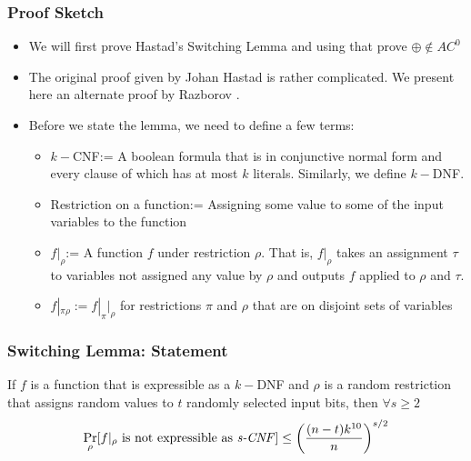 \documentclass{beamer}[11pt]
\begin{document}
\begin{frame}
\frametitle{Proof Sketch}

\begin{itemize}
 \item We will first prove Hastad's Switching Lemma and using that prove $\oplus \not\in AC^0$
 \item The original proof given by Johan Hastad \cite{thesis} is rather complicated. We present here an alternate proof by Razborov \cite{alternate}.
 \item Before we state the lemma, we need to define a few terms:
 \pause
 \begin{itemize}
  \item $k-$CNF:= A boolean formula that is in conjunctive normal form and every clause of which has at most $k$ literals. Similarly, we define $k-$DNF.
  \item Restriction on a function:= Assigning some value to some of the input variables to the function
  \item $f|_\rho$:= A function $f$ under restriction $\rho$. That is, $f|_\rho$ takes an assignment $\tau$ to variables not assigned any value by $\rho$ and outputs $f$ applied to $\rho$ and $\tau$.
  \item $f|_{\pi\rho} := f|_\pi|_\rho $ for restrictions $\pi$ and $\rho$ that are on disjoint sets of variables
 \end{itemize}

\end{itemize}

\end{frame}


\begin{frame}
\frametitle{Switching Lemma: Statement}

If $f$ is a function that is expressible as a $k-$DNF and $\rho$ is a random restriction that assigns random values to $t$ randomly selected input bits, then $\forall s\geq 2$
\begin{equation}
 \Pr\limits_{\rho}[f|_{\rho} \text{ is not expressible as \emph{s-CNF}} ] \leq \left(\frac{(n-t)k^{10} }{n}\right)^{s/2}
\end{equation}

\end{frame}

\end{document}
